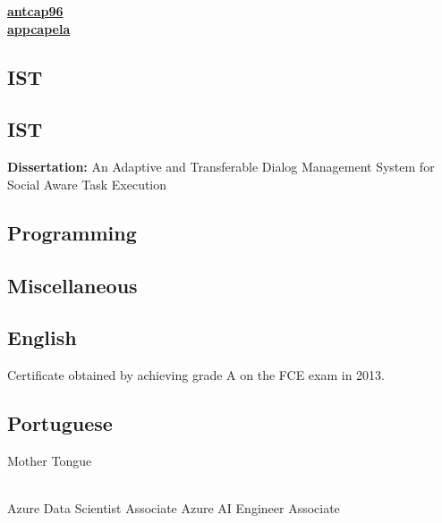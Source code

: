 \documentclass[a4paper]{MagicalCV}
\begin{document}
\begin{minipage}[t]{0.33\textwidth} 


 \href{https://github.com/antcap96}{\bf antcap96} \\
 \href{https://www.linkedin.com/in/appcapela/}{\bf appcapela}
\sectionsep


\subsection{IST}
\vspace{\topsep} %
\sectionsep

\subsection{IST}
\textbf{Dissertation: }
An Adaptive and Transferable Dialog Management System for Social Aware Task Execution \cite{capela2019adaptive}
\sectionsep


\subsection{Programming}
\sectionsep
\subsection{Miscellaneous}


\subsection{English}
\vspace{\topsep} %
Certificate obtained by achieving grade A on the FCE exam in 2013.
\sectionsep

\subsection{Portuguese}
Mother Tongue
\vspace{\topsep} %
\sectionsep


 \\
Azure Data Scientist Associate
Azure AI Engineer Associate

\end{minipage} 
\end{document}
